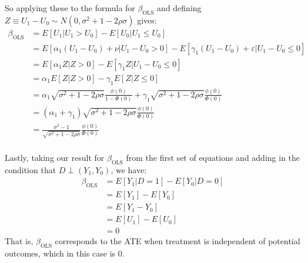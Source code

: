 \documentclass{article}
\begin{document}
\begin{solution}
So applying these to the formula for $\beta_\text{OLS}$ and defining $Z \equiv U_1-U_0 \sim N(0,\sigma^2+1-2\rho\sigma)$ gives:
\begin{align*}
    \beta_\text{OLS} &= E[U_1|U_1>U_0]-E[U_0|U_1\leq U_0] \\
    &= E[\alpha_1(U_1-U_0)+\nu |U_1-U_0>0]-E[\gamma_1(U_1-U_0)+\varepsilon | U_1 - U_0 \leq 0] \\
    &= E[\alpha_1 Z | Z >0]-E[\gamma_1 Z | U_1 - U_0 \leq 0] \tag{$\nu,\varepsilon \perp U_1-U_0$} \\
    &= \alpha_1 E[Z|Z>0]-\gamma_1 E[ Z | Z \leq 0] \\
    &= \alpha_1 \sqrt{\sigma^2+1-2\rho\sigma} \frac{\phi(0)}{1-\Phi(0)} + \gamma_1  \sqrt{\sigma^2+1-2\rho\sigma} \frac{\phi(0)}{\Phi(0)} \\
    &=  (\alpha_1  + \gamma_1)\sqrt{\sigma^2+1-2\rho\sigma} \frac{\phi(0)}{\Phi(0)} \tag{$\Phi(0)=1-\Phi(0)$} \\ 
    &=  \frac{\sigma^2-1}{\sqrt{\sigma^2+1-2\rho\sigma}} \frac{\phi(0)}{\Phi(0)} \\
\end{align*}

Lastly, taking our result for $\beta_\text{OLS}$ from the first set of equations and adding in the condition that $D \perp (Y_1,Y_0)$, we have:
\begin{align*}
    \beta_\text{OLS} &= E[Y_1|D=1] - E[Y_0 | D=0] \\
    &= E[Y_1] - E[Y_0] \\
    &= E[Y_1-Y_0] \tag{ATE} \\
    &= E[U_1] - E[U_0] \\
    &= 0
\end{align*}
That is, $\beta_\text{OLS}$ corresponds to the ATE when treatment is independent of potential outcomes, which in this case is 0.

\end{solution}
\end{document}
